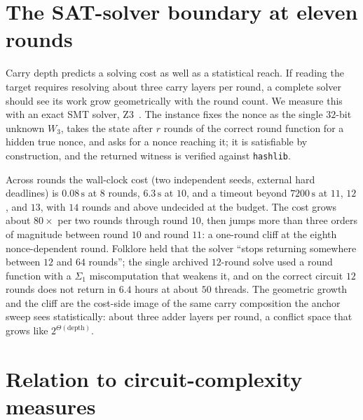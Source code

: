 \documentclass[11pt]{article}
\begin{document}
\section{The SAT-solver boundary at eleven rounds}\label{sec:sat}

Carry depth predicts a solving cost as well as a statistical reach. If
reading the target requires resolving about three carry layers per round, a
complete solver should see its work grow geometrically with the round
count. We measure this with an exact SMT solver, Z3~\cite{z3}. The
instance fixes the nonce as the single $32$-bit unknown $W_3$, takes the
state after $r$ rounds of the correct round function for a hidden true
nonce, and asks for a nonce reaching it; it is satisfiable by construction,
and the returned witness is verified against \texttt{hashlib}.

Across rounds the wall-clock cost (two independent seeds, external hard
deadlines) is $0.08\,\mathrm{s}$ at $8$ rounds, $6.3\,\mathrm{s}$ at $10$,
and a timeout beyond $7200\,\mathrm{s}$ at $11$, $12$, and $13$, with
$14$ rounds and above undecided at the budget. The cost grows about
$80\times$ per two rounds through round $10$, then jumps more than three
orders of magnitude between round $10$ and round $11$: a one-round cliff at
the eighth nonce-dependent round. Folklore held that the solver ``stops
returning somewhere between $12$ and $64$ rounds''; the single archived
$12$-round solve used a round function with a $\Sigma_1$ miscomputation
that weakens it, and on the correct circuit $12$ rounds does not return in
$6.4$ hours at about $50$ threads. The geometric growth and the cliff are
the cost-side image of the same carry composition the anchor sweep sees
statistically: about three adder layers per round, a conflict space that
grows like $2^{\Theta(\text{depth})}$.

\section{Relation to circuit-complexity measures}\label{sec:circuit}
\end{document}
